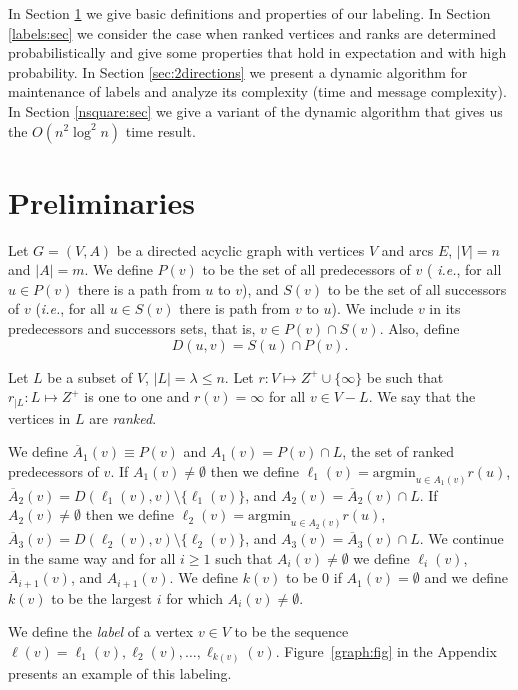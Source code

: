 \documentclass[11pt]{article}
\newcommand{\argmin}{\mathrm{argmin}}
\theoremstyle{plain}
\theoremstyle{definition}
\theoremstyle{remark}
\numberwithin{equation}{section}
\begin{document}
In Section \ref{prelim:sec} we give basic definitions and properties
of our labeling. In Section \ref{labels:sec} we consider the case
when ranked vertices and ranks are determined probabilistically and
give some properties that hold in expectation and with high
probability.
 In Section
\ref{sec:2directions} we present a dynamic algorithm for maintenance
of labels and analyze its complexity (time and message complexity).
In Section \ref{nsquare:sec} we give a variant of the dynamic
algorithm that gives us the $O(n^2\log^2 n)$ time result.


\section{Preliminaries} \label{prelim:sec}

Let $G=(V,A)$ be a directed acyclic graph with vertices $V$ and arcs $E$, $|V|=n$ and  $|A|=m$.
We define  $P(v)$ to be the set of all predecessors of $v$ ({\sl
i.e.}, for all $u\in P(v)$ there is a path from $u$ to $v$),  and
$S(v)$ to be the set of all successors of $v$ ({\sl i.e.}, for all
$u\in S(v)$ there is path from $v$ to $u$). We include $v$ in its
predecessors and successors sets, that is, $v\in P(v)\cap
S(v)$. Also, define $$D(u,v) = S(u) \cap P(v).$$

Let $L$ be a subset of $V$, $|L|=\lambda\leq n$.  Let $r:V\mapsto
Z^+\cup \{\infty\}$  be such that $r_{|L}:L\mapsto Z^+$ is one to
one and $r(v)=\infty$ for all $v\in V-L$. We say that the
vertices in $L$ are {\em ranked}.

We define $\overline{A}_1(v) \equiv P(v)$ and $A_1(v) = P(v)\cap L$, the set of ranked predecessors of
$v$. If $A_1(v) \not= \emptyset$ then we define $\ell_1(v) =
\argmin_{u\in A_1(v)} r(u)$, 
$\overline{A}_2(v)=  D(\ell_{1}(v),v)
\setminus \{\ell_1(v)\}$, and  $A_{2}(v) = \overline{A}_2(v) \cap L$. If $A_2(v)
\not= \emptyset$ then we define $\ell_2(v) = \argmin_{u\in A_2(v)}
r(u)$, $\overline{A}_3(v)=  D(\ell_{2}(v),v) \setminus \{\ell_2(v)\}
$, and  $A_{3}(v) = \overline{A}_3(v) \cap L$.  We continue in the same way and for all $i
\ge 1$ such that $A_i(v) \not= \emptyset$ we define $\ell_i(v)$, $\overline{A}_{i+1}(v)$,  and
$A_{i+1}(v)$. We define $k(v)$ to be $0$ if $A_1(v) = \emptyset$ and
 we define $k(v)$ to be the largest $i$ for which $A_i(v)
\not= \emptyset$.




 We define the
\emph{label} of a vertex $v\in V$ to be the sequence $\ell(v) =
\ell_1(v), \ell_2(v), \ldots, \ell_{k(v)}(v).$ Figure~\ref{graph:fig} in the Appendix presents an example of this labeling.
\end{document}
